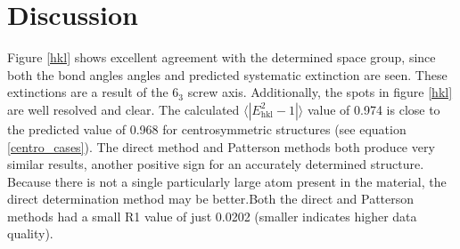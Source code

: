 \documentclass[]{scrartcl}
\begin{document}
\section{Discussion}
Figure \ref{hkl} shows excellent agreement with the determined space group, since both the bond angles angles and predicted systematic extinction are seen. These extinctions are a result of the $ 6_3 $ screw axis. Additionally, the spots in figure \ref{hkl} are well resolved and clear. The calculated ${\langle |E_{\textrm{hkl}}^2-1| \rangle}$ value of 0.974 is close to the predicted value of 0.968 for centrosymmetric structures (see equation \ref{centro_cases}). The direct method and Patterson methods both produce very similar results, another positive sign for an accurately determined structure. Because there is not a single particularly large atom present in the material, the direct determination method may be better.Both the direct and Patterson methods had a small R1 value of just 0.0202 (smaller indicates higher data quality). 




\nocite{pat}
\nocite{expo2014}
\nocite{mit}
\nocite{ripoll}
\nocite{scidir}


% 

\end{document}
